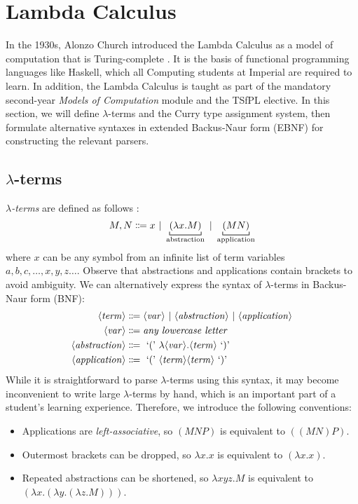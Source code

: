 \section{Lambda Calculus}
In the 1930s, Alonzo Church introduced the Lambda Calculus \cite{church:1936} as a model of computation that is Turing-complete \cite{turing:1937}. It is the basis of functional programming languages like Haskell, which all Computing students at Imperial are required to learn. In addition, the Lambda Calculus is taught as part of the mandatory second-year \textit{Models of Computation} module and the TSfPL elective. In this section, we will define $\lambda$-terms and the Curry type assignment system, then formulate alternative syntaxes in extended Backus-Naur form (EBNF) for constructing the relevant parsers.

\subsection{\(\lambda\)-terms}\label{lambda:lambda-terms}
\textit{$\lambda$-terms} are defined as follows \cite{church:1941}:
\[
    M,N \Coloneqq x \alt \underbracket[0.6pt]{(\lambda x. M)}_\text{abstraction} \alt \underbracket[0.6pt]{(MN)}_\text{application}
\]
where $x$ can be any symbol from an infinite list of term variables $a, b, c, \ldots, x, y, z \ldots$. Observe that abstractions and applications contain brackets to avoid ambiguity. We can alternatively express the syntax of $\lambda$-terms in Backus-Naur form (BNF):
\begin{align*}
    \langle\mathit{term}\rangle &\Coloneqq \langle\mathit{var}\rangle \ |\  \langle\mathit{abstraction}\rangle \ |\  \langle\mathit{application}\rangle \\
    \langle\mathit{var}\rangle &\Coloneqq \textit{any lowercase letter} \\
    \langle\mathit{abstraction}\rangle &\Coloneqq \text{ `(' } \lambda \langle\mathit{var}\rangle. \langle\mathit{term}\rangle \text{ `)' } \\
    \langle\mathit{application}\rangle &\Coloneqq \text{ `(' } \langle\mathit{term}\rangle \langle\mathit{term}\rangle \text{ `)' }
\end{align*}
While it is straightforward to parse $\lambda$-terms using this syntax, it may become inconvenient to write large $\lambda$-terms by hand, which is an important part of a student's learning experience. Therefore, we introduce the following conventions:
\begin{itemize}
    \item Applications are \textit{left-associative}, so $(MNP)$ is equivalent to $((MN)P)$.
    \item Outermost brackets can be dropped, so $\lambda x. x$ is equivalent to $(\lambda x. x)$.
    \item Repeated abstractions can be shortened, so $\lambda xyz. M$ is equivalent to $(\lambda x. (\lambda y. (\lambda z. M)))$.
\end{itemize}
